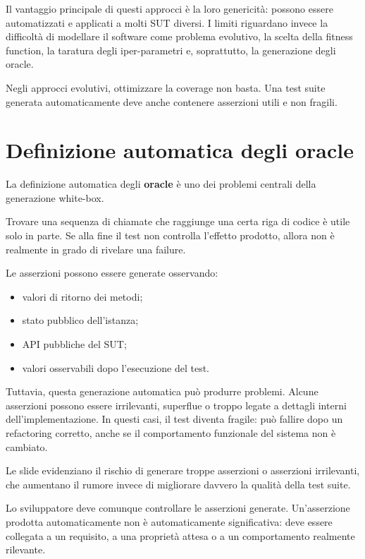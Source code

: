 Il vantaggio principale di questi approcci è la loro genericità: possono essere automatizzati e applicati a molti SUT diversi. I limiti riguardano invece la difficoltà di modellare il software come problema evolutivo, la scelta della fitness function, la taratura degli iper-parametri e, soprattutto, la generazione degli oracle.

\begin{notaesame}
Negli approcci evolutivi, ottimizzare la coverage non basta. Una test suite generata automaticamente deve anche contenere asserzioni utili e non fragili.
\end{notaesame}

\section{Definizione automatica degli oracle}

La definizione automatica degli \textbf{oracle} è uno dei problemi centrali della generazione white-box.

Trovare una sequenza di chiamate che raggiunge una certa riga di codice è utile solo in parte. Se alla fine il test non controlla l'effetto prodotto, allora non è realmente in grado di rivelare una failure.

Le asserzioni possono essere generate osservando:

\begin{itemize}
    \item valori di ritorno dei metodi;
    \item stato pubblico dell'istanza;
    \item API pubbliche del SUT;
    \item valori osservabili dopo l'esecuzione del test.
\end{itemize}

Tuttavia, questa generazione automatica può produrre problemi. Alcune asserzioni possono essere irrilevanti, superflue o troppo legate a dettagli interni dell'implementazione. In questi casi, il test diventa fragile: può fallire dopo un refactoring corretto, anche se il comportamento funzionale del sistema non è cambiato.

\begin{notaslide}
Le slide evidenziano il rischio di generare troppe asserzioni o asserzioni irrilevanti, che aumentano il rumore invece di migliorare davvero la qualità della test suite.
\end{notaslide}

\begin{notaprof}
Lo sviluppatore deve comunque controllare le asserzioni generate. Un'asserzione prodotta automaticamente non è automaticamente significativa: deve essere collegata a un requisito, a una proprietà attesa o a un comportamento realmente rilevante.
\end{notaprof}

